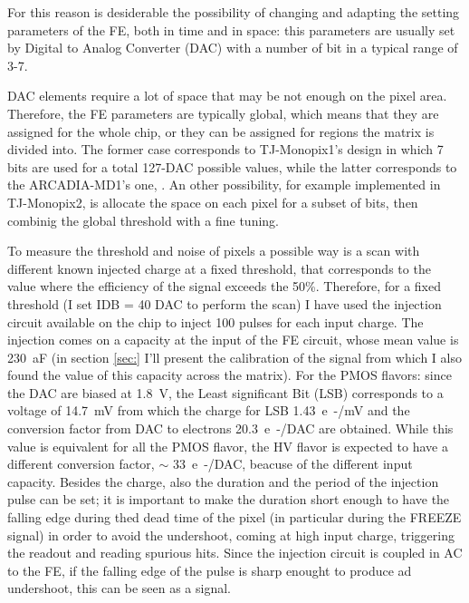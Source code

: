         For this reason is desiderable the possibility of changing and adapting the setting parameters of the FE, both in time and in space: this parameters are usually set by Digital to Analog Converter (DAC) with a number of bit in a typical range of 3-7.

        DAC elements require a lot of space that may be not enough on the pixel area. Therefore, the FE parameters are typically global, which means that they are assigned for the whole chip, or they can be assigned for regions the matrix is divided into. 
        The former case corresponds to TJ-Monopix1's design in which 7 bits are used for a total 127-DAC possible values, while the latter corresponds to the ARCADIA-MD1's one, . 
        An other possibility, for example implemented in TJ-Monopix2, is allocate the space on each pixel for a subset of bits, then combinig the global threshold with a fine tuning. 

        To measure the threshold and noise of pixels a possible way is a scan with different known injected charge at a fixed threshold, that corresponds to the value where the efficiency of the signal exceeds the 50\%.
        Therefore, for a fixed threshold (I set IDB = 40 DAC to perform the scan) I have used the injection circuit available on the chip to inject 100 pulses for each input charge. 
        The injection comes on a capacity at the input of the FE circuit, whose mean value is \SI{230}{aF} (in section \ref{sec:} I'll present the calibration of the signal from which I also found the value of this capacity across the matrix). 
        For the PMOS flavors: since the DAC are biased at \SI{1.8}{V}, the Least significant Bit (LSB) corresponds to a voltage of \SI{14.7}{mV} from which the charge for LSB \SI{1.43}{e-/mV} and the conversion factor from DAC to electrons \SI{20.3}{e-/DAC} are obtained. 
        While this value is equivalent for all the PMOS flavor, the HV flavor is expected to have a different conversion factor, $\sim$ \SI{33}{e-/DAC}, beacuse of the different input capacity. 
        Besides the charge, also the duration and the period of the injection pulse can be set; it is important to make the duration short enough to have the falling edge during thed dead time of the pixel (in particular during the FREEZE signal) in order to avoid the undershoot, coming at high input charge, triggering the readout and reading spurious hits. 
        Since the injection circuit is coupled in AC to the FE, if the falling edge of the pulse is sharp enought to produce ad undershoot, this can be seen as a signal. 

